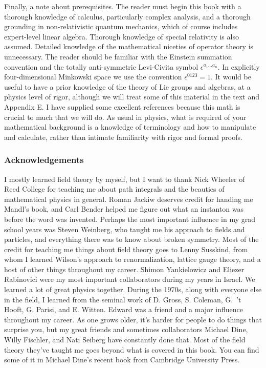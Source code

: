 Finally, a note about prerequisites.  The reader must begin this book with a
thorough knowledge of calculus, particularly complex analysis, and a thorough
grounding in non-relativistic quantum mechanics, which of course includes
expert-level linear algebra.  Thorough knowledge of special relativity is also
assumed.  Detailed knowledge of the mathematical niceties of operator theory
is unnecessary.  The reader should be familiar with the Einstein summation
convention and the totally anti-symmetric Levi-Civita symbol
\(\epsilon^{a_1\ldots a_n}\).  In explicitly four-dimensional Minkowski space we use
the convention \(\epsilon^{0123}=1\).  It would be useful to have a prior knowledge of the theory
of Lie groups and algebras, at a physics level of rigor, although we will
treat some of this material in the text and Appendix E.  I have supplied some
excellent references \cite{banks-ref-1,banks-ref-2,banks-ref-3,banks-ref-4}
because this math is crucial to much that we will
do.  As usual in physics, what is required of your mathematical background is
a knowledge of terminology and how to manipulate and calculate, rather than
intimate familiarity with rigor and formal proofs.

\subsubsection{Acknowledgements}

I mostly learned field theory by myself, but I want to thank Nick Wheeler of
Reed College for teaching me about path integrals and the beauties of
mathematical physics in general.  Roman Jackiw deserves credit for handing me
Mandl's book, and Carl Bender helped me figure out what an instanton was before
the word was invented.  Perhaps the most important influence in my grad school
years was Steven Weinberg, who taught me his approach to fields and particles,
and everything there was to know about broken
symmetry.  Most of the credit for teaching me things about field theory goes to
Lenny Susskind, from whom I learned Wilson's approach to renormalization,
lattice gauge theory, and a host of other things throughout my career.  Shimon
Yankielowicz and Eliezer Rabinovici were my most important collaborators during
my years in Israel.  We learned a lot of great physics together.  During the
1970s, along with everyone else in the field, I learned from the seminal work
of D. Gross, S. Coleman, G.~'t Hooft, G. Parisi, and E. Witten.  Edward was a
friend and a major influence throughout my career.  As one grows older, it's
harder for people to do things that surprise you, but my great friends and sometimes
collaborators Michael Dine, Willy Fischler, and Nati Seiberg have constantly
done that.  Most of the field theory they've taught me goes beyond what is
covered in this book.  You can find some of it in Michael Dine's recent book
from Cambridge University Press.


